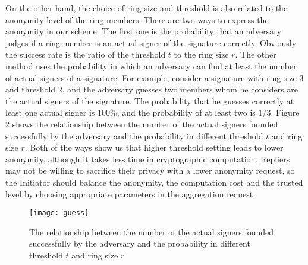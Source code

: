 \documentclass[a4paper]{article}
\begin{document}
On the other hand, the choice of ring size and threshold is also related to the anonymity level of the ring members. There are two ways to express the anonymity in our scheme. The first one is the probability that an adversary judges if a ring member is an actual signer of the signature correctly. Obviously the success rate is the ratio of the threshold $t$ to the ring size $r$.  The other method uses the probability in which an adversary can find at least the number of actual signers of a signature. For example, consider a signature with ring size $3$ and threshold $2$, and the adversary guesses two members whom he considers are the actual signers of the signature. The probability that he guesses correctly at least one actual signer is 100\%, and the probability of at least two is $1/3$. Figure 2 shows the relationship between the number of the actual signers founded successfully by the adversary and the probability in different threshold $t$ and ring size $r$. Both of the ways show us that higher threshold setting leads to lower anonymity, although it takes less time in cryptographic computation. Repliers may not be willing to sacrifice their privacy with a lower anonymity request, so the Initiator should balance the anonymity, the computation cost and the trusted level by choosing appropriate parameters in the aggregation request.

\begin{figure}
  \centering
  \texttt{[image: guess]}
  \caption{The relationship between the number of the actual signers founded successfully by the adversary and the probability in different threshold $t$ and ring size $r$}
\end{figure}
\end{document}
